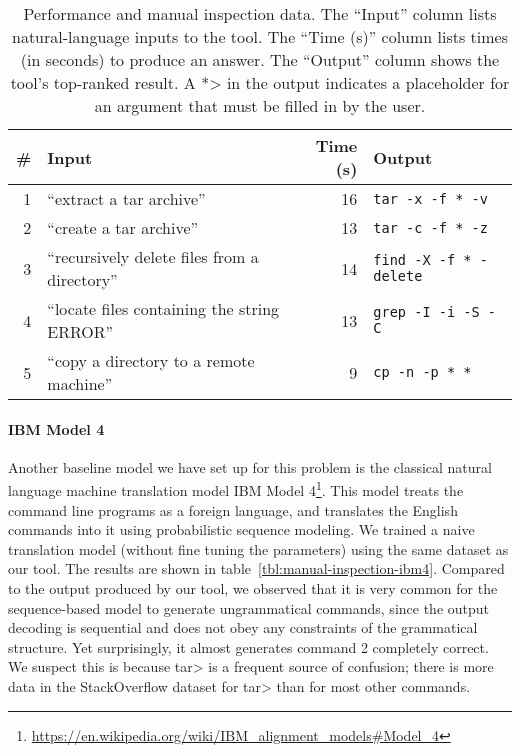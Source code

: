 \begin{table}
    \begin{center}
    \begin{tabular}{rlrl}
        \# & \textbf{Input} & \textbf{Time (s)} & \textbf{Output} \\
        \hline
        1  & ``extract a tar archive'' & 16 & \texttt{tar -x -f * -v} \\
        2  & ``create a tar archive''  & 13 & \texttt{tar -c -f * -z} \\
        3  & ``recursively delete files from a directory'' & 14 & \texttt{find -X -f * -delete} \\
        4  & ``locate files containing the string ERROR''  & 13 & \texttt{grep -I -i -S -C} \\
        5  & ``copy a directory to a remote machine'' & 9 & \texttt{cp -n -p * *} \\
    \end{tabular}
    \end{center}
    \caption{Performance and manual inspection data. The ``Input'' column lists
        natural-language inputs to the tool. The ``Time (s)'' column lists times
        (in seconds) to produce an answer. The ``Output'' column shows the
        tool's top-ranked result. A \<*> in the output indicates a placeholder
        for an argument that must be filled in by the user.}
    \label{tbl:manual-inspection}
\end{table}

\paragraph{IBM Model 4} Another baseline model we have
set up for this problem is the classical natural language machine translation
model IBM Model 4\footnote{\url{https://en.wikipedia.org/wiki/IBM_alignment_models\#Model_4}}.
This model treats the command line programs as a foreign language, and translates
the English commands into it using probabilistic sequence modeling. We trained a
naive translation model (without fine tuning the parameters) using the same dataset as our tool.
The results are shown in table~\ref{tbl:manual-inspection-ibm4}.
Compared to the output produced by our tool, we observed that it is very common for
the sequence-based model to generate ungrammatical commands, since the output decoding
is sequential and does not obey any constraints of the grammatical structure. Yet surprisingly,
it almost generates command 2 completely correct. We suspect this is because
\<tar> is a frequent source of confusion; there is more data in the StackOverflow
dataset for \<tar> than for most other commands.

